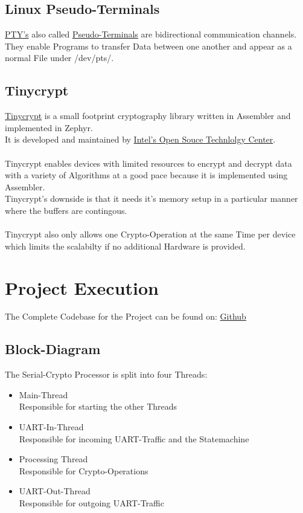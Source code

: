 \subsection{Linux Pseudo-Terminals}

\href{https://linux.die.net/man/7/pty}
{PTY's} also called
\href{https://linux.die.net/man/7/pty}
{Pseudo-Terminals} are bidirectional communication channels.
They enable Programs to transfer Data between one another
and appear as a normal File under /dev/pts/.

\subsection{Tinycrypt}

\href{https://01.org/tinycrypt}
{Tinycrypt} is a small footprint cryptography library written
in Assembler and implemented in Zephyr.
\\
It is developed and maintained by
\href{https://01.org/}
{Intel's Open Souce Technlolgy Center}.
\\
\\
Tinycrypt enables devices with limited resources to encrypt and decrypt data
with a variety of Algorithms at a good pace because it is implemented using
Assembler.
\\
Tinycrypt's downside is that it needs it's memory setup in a particular manner
where the buffers are contingous.
\\
\\
Tinycrypt also only allows one Crypto-Operation at the same Time per device
which limits the scalabilty if no additional Hardware is provided.

\pagebreak

\section{Project Execution}

The Complete Codebase for the Project can be found on:
\href{https://github.com/davirieser/zephyr}
{Github}

\subsection{Block-Diagram}

The Serial-Crypto Processor is split into four Threads:
\begin{itemize}
	\item Main-Thread\\
		Responsible for starting the other Threads
	\item UART-In-Thread\\
		Responsible for incoming UART-Traffic and the Statemachine
	\item Processing Thread\\
		Responsible for Crypto-Operations
	\item UART-Out-Thread\\
		Responsible for outgoing UART-Traffic
\end{itemize}

